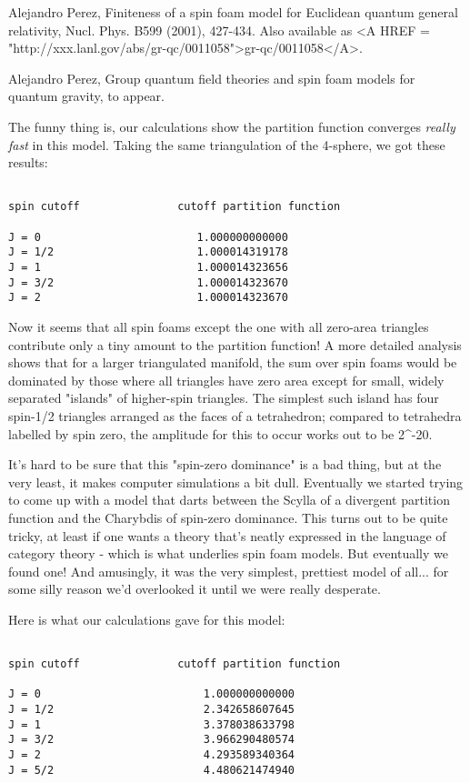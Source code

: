 Alejandro Perez, Finiteness of a spin foam model for Euclidean quantum
general relativity, Nucl. Phys. B599 (2001), 427-434.  Also available as
<A HREF = "http://xxx.lanl.gov/abs/gr-qc/0011058">gr-qc/0011058</A>.

Alejandro Perez, Group quantum field theories and spin foam models for
quantum gravity, to appear. 

The funny thing is, our calculations show the partition function 
converges \emph{really fast} in this model.  Taking the same triangulation 
of the 4-sphere, we got these results:


\begin{verbatim}

spin cutoff               cutoff partition function 

J = 0                        1.000000000000 
J = 1/2                      1.000014319178                 
J = 1                        1.000014323656                 
J = 3/2                      1.000014323670                 
J = 2                        1.000014323670                 
\end{verbatim}
    
Now it seems that all spin foams except the one with all zero-area
triangles contribute only a tiny amount to the partition function!  
A more detailed analysis shows that for a larger triangulated manifold,
the sum over spin foams would be dominated by those where all triangles
have zero area except for small, widely separated "islands" of
higher-spin triangles.  The simplest such island has four spin-1/2
triangles arranged as the faces of a tetrahedron; compared to tetrahedra
labelled by spin zero, the amplitude for this to occur works out to be 
2^{-20}.  

It's hard to be sure that this "spin-zero dominance" is a bad
thing, but at the very least, it makes computer simulations a bit dull.
Eventually we started trying to come up with a model that darts between
the Scylla of a divergent partition function and the Charybdis of
spin-zero dominance.  This turns out to be quite tricky, at least if one
wants a theory that's neatly expressed in the language of category
theory - which is what underlies spin foam models.  But eventually we
found one!  And amusingly, it was the very simplest, prettiest model of
all... for some silly reason we'd overlooked it until we were really
desperate.

Here is what our calculations gave for this model:


\begin{verbatim}

spin cutoff               cutoff partition function 

J = 0                         1.000000000000  
J = 1/2                       2.342658607645   
J = 1                         3.378038633798   
J = 3/2                       3.966290480574   
J = 2                         4.293589340364   
J = 5/2                       4.480621474940   
\end{verbatim}
    
